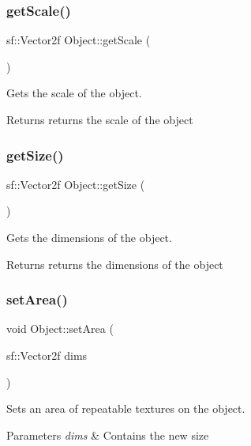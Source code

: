 \subsubsection{\texorpdfstring{get\+Scale()}{getScale()}}
{\footnotesize\ttfamily sf\+::\+Vector2f Object\+::get\+Scale (\begin{DoxyParamCaption}{ }\end{DoxyParamCaption})}



Gets the scale of the object. 

\begin{DoxyReturn}{Returns}
returns the scale of the object 
\end{DoxyReturn}
\mbox{\label{class_object_acbdc3c4af57da23e7fe64c2c87ae924e}} 
\subsubsection{\texorpdfstring{get\+Size()}{getSize()}}
{\footnotesize\ttfamily sf\+::\+Vector2f Object\+::get\+Size (\begin{DoxyParamCaption}{ }\end{DoxyParamCaption})}



Gets the dimensions of the object. 

\begin{DoxyReturn}{Returns}
returns the dimensions of the object 
\end{DoxyReturn}
\mbox{\label{class_object_a4e0b54d91d7cc6b0935dd64101363190}} 
\subsubsection{\texorpdfstring{set\+Area()}{setArea()}}
{\footnotesize\ttfamily void Object\+::set\+Area (\begin{DoxyParamCaption}\item[{sf\+::\+Vector2f}]{dims }\end{DoxyParamCaption})}



Sets an area of repeatable textures on the object. 


\begin{DoxyParams}{Parameters}
{\em dims} & Contains the new size \\
\hline
\end{DoxyParams}
\mbox{\label{class_object_afd817b216f79b53ef6fcb5a51fb6c8a5}} 
